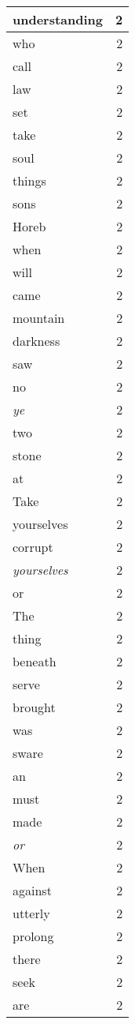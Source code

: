 \begin{center}
\begin{longtable}{l|r}
understanding & 2 \\ \hline
who & 2 \\ \hline
call & 2 \\ \hline
law & 2 \\ \hline
set & 2 \\ \hline
take & 2 \\ \hline
soul & 2 \\ \hline
things & 2 \\ \hline
sons & 2 \\ \hline
Horeb & 2 \\ \hline
when & 2 \\ \hline
will & 2 \\ \hline
came & 2 \\ \hline
mountain & 2 \\ \hline
darkness & 2 \\ \hline
saw & 2 \\ \hline
no & 2 \\ \hline
\emph{ye} & 2 \\ \hline
two & 2 \\ \hline
stone & 2 \\ \hline
at & 2 \\ \hline
Take & 2 \\ \hline
yourselves & 2 \\ \hline
corrupt & 2 \\ \hline
\emph{yourselves} & 2 \\ \hline
or & 2 \\ \hline
The & 2 \\ \hline
thing & 2 \\ \hline
beneath & 2 \\ \hline
serve & 2 \\ \hline
brought & 2 \\ \hline
was & 2 \\ \hline
sware & 2 \\ \hline
an & 2 \\ \hline
must & 2 \\ \hline
made & 2 \\ \hline
\emph{or} & 2 \\ \hline
When & 2 \\ \hline
against & 2 \\ \hline
utterly & 2 \\ \hline
prolong & 2 \\ \hline
there & 2 \\ \hline
seek & 2 \\ \hline
are & 2 \\ \hline

\end{longtable}
\end{center}

